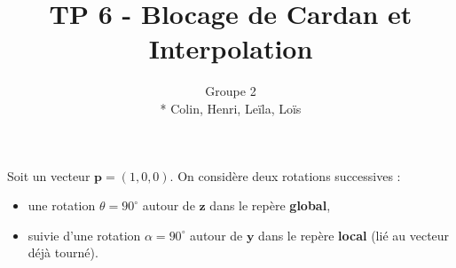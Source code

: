 \documentclass[a4paper,12pt]{article}
\title{TP 6 - Blocage de Cardan et Interpolation}
\author{Groupe 2 \\* Colin, Henri, Leïla, Loïs}
\begin{document}
\maketitle


Soit un vecteur \( \mathbf{p} = (1, 0, 0) \). On considère deux rotations successives :
\begin{itemize}
  \item une rotation \( \theta = 90^\circ \) autour de \( \mathbf{z} \) dans le repère \textbf{global},
  \item suivie d’une rotation \( \alpha = 90^\circ \) autour de \( \mathbf{y} \) dans le repère \textbf{local} (lié au vecteur déjà tourné).
\end{itemize}
\end{document}
